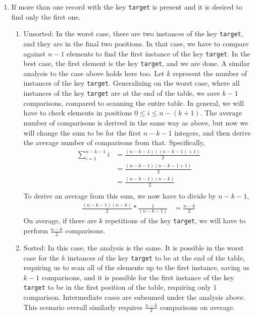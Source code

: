 \documentclass[10pt,letterpaper,final]{report}
\begin{document}
\begin{enumerate}
  \item If more than one record with the key \texttt{target} is present and it is desired to find only the first one.
        \begin{enumerate}
          \item Unsorted: In the worst case, there are two instances of the key \texttt{target}, and they are in the final two positions. In that case, we have to compare against $n-1$ elements to find the first instance of the key \texttt{target}. In the best case, the first element is the key \texttt{target}, and we are done. A similar analysis to the case above holds here too. Let $k$ represent the number of instances of the key \texttt{target}. Generalizing on the worst case, where all instances of the key \texttt{target} are at the end of the table, we save $k-1$ comparisons, compared to scanning the entire table. In general, we will have to check elements in positions $0 \le i \le n-(k+1)$. The average number of comparisons is derived in the same way as above, but now we will change the sum to be for the first $n - k - 1$ integers, and then derive the average number of comparisons from that. Specifically,
                \begin{align*}
                  \sum_{i=1}^{n - k - 1}i & = \frac{(n - k - 1)((n - k - 1)+1)}{2} \\
                                          & = \frac{(n - k - 1)(n - k - 1 + 1)}{2} \\
                                          & = \frac{(n - k - 1)(n - k)}{2}         \\
                \end{align*}
                To derive an average from this sum, we now have to divide by $n - k - 1$,
                \begin{align*}
                  \frac{(n - k - 1)(n - k)}{2} * \frac{1}{(n - k - 1)} & = \frac{n - k}{2}
                \end{align*}
                On average, if there are $k$ repetitions of the key \texttt{target}, we will have to perform $\frac{n - k}{2}$ comparisons.
          \item Sorted: In this case, the analysis is the same. It is possible in the worst case for the $k$ instances of the key \texttt{target} to be at the end of the table, requiring us to scan all of the elements up to the first instance, saving us $k-1$ comparisons, and it is possible for the first instance of the key \texttt{target} to be in the first position of the table, requiring only $1$ comparison. Intermediate cases are subsumed under the analysis above. This scenario overall similarly requires $\frac{n - k}{2}$ comparisons on average.

\end{enumerate}
\end{enumerate}
\end{document}
